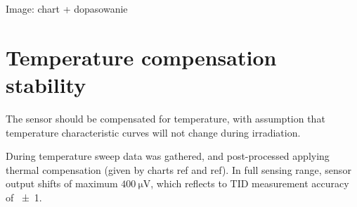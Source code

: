         Image: chart + dopasowanie


\section{Temperature compensation stability}
    The sensor should be compensated for temperature, with assumption that temperature characteristic curves will not change during irradiation.

    During temperature sweep data was gathered, and post-processed applying thermal compensation (given by charts ref and ref). In full sensing range, sensor output shifts of maximum $\SI{400}{\uV}$, which reflects to TID measurement accuracy of \SI{\pm 1}{\rad}.



    

